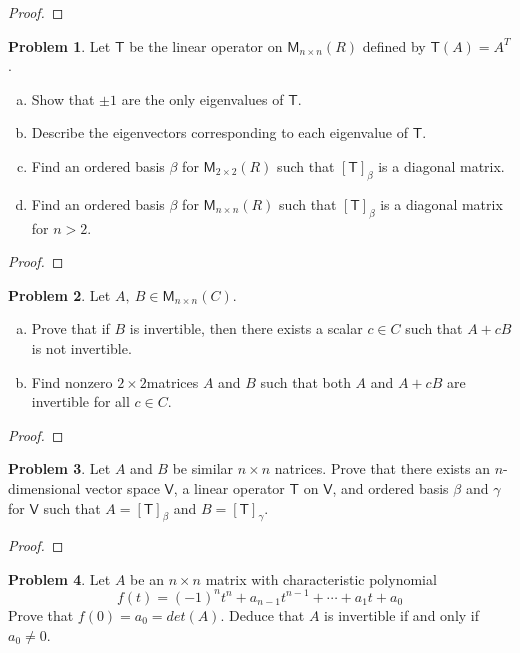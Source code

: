 \documentclass[12pt]{book}
\theoremstyle{definition}
\newtheorem{problem}{Problem}
\begin{document}
	\begin{proof}
	\end{proof}
	\newpage
	\begin{problem}
		Let $\mathsf{T}$ be the linear operator on $\mathsf{M}_{n\times n}(R)$ defined by $\mathsf{T}(A)=A^T$.
		\begin{enumerate}[(a)]
			\item Show that $\pm1$ are the only eigenvalues of $\mathsf{T}$.
			\item Describe the eigenvectors corresponding to each eigenvalue of $\mathsf{T}$.
			\item Find an ordered basis $\beta$ for $\mathsf{M}_{2\times 2}(R)$ such that $[\mathsf{T}]_\beta$ is a diagonal matrix.
			\item Find an ordered basis $\beta$ for $\mathsf{M}_{n \times n}(R)$ such that $[\mathsf{T}]_\beta$ is a diagonal matrix for $n>2$.
		\end{enumerate}
	\end{problem}
	\begin{proof}
	\end{proof}
	\newpage
	\begin{problem}
		Let $A,\ B\in\mathsf{M}_{n \times n}(C)$.
		\begin{enumerate}[(a)]
			\item Prove that if $B$ is invertible, then there exists a scalar $c\in C$ such that $A+cB$ is not invertible.
			\item Find nonzero $2\times 2 $matrices $A$ and $B$ such that both $A$ and $A+cB$ are invertible for all $c\in C$.
		\end{enumerate}
	\end{problem}
	\begin{proof}
	\end{proof}
	\newpage
	\begin{problem}
		Let $A$ and $B$ be similar $n\times n$ natrices. Prove that there exists an $n$-dimensional vector space $\mathsf{V}$, a linear operator $\mathsf{T}$ on $\mathsf{V}$, and ordered basis $\beta$ and $\gamma$ for $\mathsf{V}$ such that $A=[\mathsf{T}]_\beta$ and $B=[\mathsf{T}]_\gamma$.
	\end{problem}
	\begin{proof}
	\end{proof}
	\newpage
	\begin{problem}
		Let $A$ be an $n\times n$ matrix with characteristic polynomial
		\begin{equation*}
			f(t)=(-1)^nt^n+a_{n-1}t^{n-1}+\cdots+a_1t+a_0
		\end{equation*}
		Prove that $f(0)=a_0=det(A)$. Deduce that $A$ is invertible if and only if $a_0\neq 0$.
	\end{problem}
\end{document}
